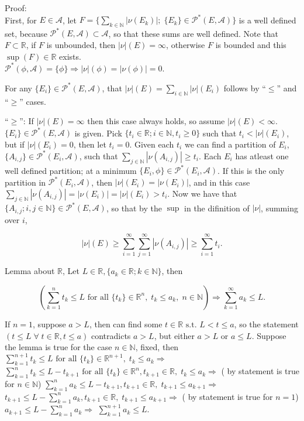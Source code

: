 \documentclass[12pt]{article}
\newcommand{\partset}[1]{ \mathcal{P}^{*}(#1) }
\newcommand{\st}[0]{ \textrm{ s.t. } }
\newcommand{\fall}[0] { \textrm{ for all } }
\newcommand{\nats}[0] { \mathbb{N}}
\newcommand{\reals}[0] { \mathbb{R}}
\newcommand{\A}[0] { \mathcal{A} }
\newcommand{\rimply}[0] { \Rightarrow }
\begin{document}
Proof: \\

\noindent
First, for $E \in \A$, let $ F = \{  \sum_{k \in \nats} |\nu(E_k)| ; \; \{ E_k\} \in \partset{E, \A}  \}$ is a well defined set, because $\partset{E, \A} \subset \A$, so that these sums are well defined. Note that $F \subset \reals$, if $F$ is unbounded, then $|\nu|(E) = \infty$, otherwise $F$ is bounded and this $\sup(F) \in \reals$ exists. \\


\noindent
 $\partset{\phi, \A} = \{ \phi \} \rimply |\nu|(\phi) = |\nu(\phi)| = 0$. 

\noindent 
For any $\{ E_i \} \in \partset{E, \A}$, that $|\nu|(E) = \sum_{i \in \nats} |\nu|(E_i)$ follows by ``$\le$'' and ``$\ge$'' cases. \\


\noindent


\noindent
``$\ge$'': If $|\nu|(E) = \infty$ then this case always holds, so assume $|\nu|(E) < \infty$. $\{ E_i \} \in \partset{ E, \A }$ is given. Pick $\{ t_i \in \reals; i \in \nats, t_i \ge 0 \}$ such that $t_i < |\nu|(E_i)$, but if $|\nu|(E_i) = 0$, then let $t_i = 0$. Given each $t_i$ we can find a partition of $E_i$, $\{A_{i,j} \} \in \partset{E_i, \A}$, such that $\sum_{j \in \nats} |\nu(A_{i,j})| \ge t_i$. Each $E_i$ has atleast one well defined partition; at a minimum $\{E_i, \phi \} \in \partset{E_i, \A}$. If this is the only partition in $\partset{E_i, \A}$, then $|\nu|(E_i) = |\nu(E_i)|$, and in this case $\sum_{j \in \nats} |\nu(A_{i,j})| = |\nu(E_i)| = |\nu|(E_i) > t_i$.  Now we have that $\{ A_{i,j}; i,j \in \nats \} \in \partset{E, \A}$, so that by the $\sup$ in the difinition of $|\nu|$, summing over $i$,

$$    |\nu|(E) \ge \sum_{i =1 }^\infty \sum_{j =1}^\infty |\nu(A_{i,j})| \ge \sum_{i=1}^\infty t_i. $$

\noindent
Lemma about $\reals$, Let $L \in \reals, \{ a_k \in \reals; k \in \nats \}$, then

$$
\left(  \sum_{k=1}^n t_k \le L  \fall \{ t_k \} \in \reals^n, \; t_k \le a_k, \; n \in \nats  \right) \rimply \sum_{k = 1} ^ \infty a_k \le L.
$$

\noindent
If $n=1$, suppose $a > L$, then can find some $t \in \reals \st L < t \le a$, so the statement $ \left( t \le L  \; \forall \; t \in \reals, t \le a \right)$ contradicts $a > L$, but either $a > L$ or  $a \le L$. Suppose the lemma is true for the case $n \in \nats$, fixed, then $  \sum_{k=1}^{n+1} t_k \le L  \fall \{ t_k \} \in \reals^{n+1}, \; t_k \le a_k  \rimply$
$  \sum_{k=1}^{n} t_k \le L-t_{k+1}  \fall \{ t_k \} \in \reals^{n}, t_{k+1} \in \reals, \; t_k \le a_k \rimply$ ( by statement is true for $n \in \nats$)
$  \sum_{k=1}^{n} a_k \le L-t_{k+1},  t_{k+1} \in \reals, \; t_{k+1} \le a_{k+1} \rimply$
$  t_{k+1} \le L-\sum_{k=1}^{n} a_k,  t_{k+1} \in \reals, \; t_{k+1} \le a_{k+1} \rimply$
( by statement is true for $n=1$) $a_{k+1} \le L-\sum_{k=1}^{n} a_k \rimply $  $\sum_{k=1}^{n+1} a_k \le L$. \\
\end{document}
